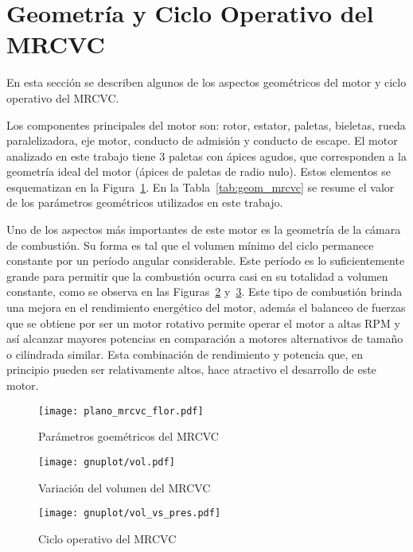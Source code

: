 \section{Geometría y Ciclo Operativo del MRCVC}
%
En esta sección se describen algunos de los aspectos geométricos del motor y
ciclo operativo del MRCVC.

Los componentes principales del motor son: rotor, estator, paletas, bieletas,
rueda paralelizadora, eje motor, conducto de admisión y conducto de escape.
%
El motor analizado en este trabajo tiene 3 paletas con ápices agudos, que
corresponden a la geometría ideal del motor (ápices de paletas de radio nulo).
%
Estos elementos se esquematizan en la Figura~\ref{fig:geom_flor_mrcvc}.
%
En la Tabla~\ref{tab:geom_mrcvc} se resume el valor de los parámetros
geométricos utilizados en este trabajo.

Uno de los aspectos más importantes de este motor es la geometría de la cámara
de combustión.
%
Su forma es tal que el volumen mínimo del ciclo permanece constante por un
período angular considerable. %
%
Este período es lo suficientemente grande para permitir que la combustión
ocurra casi en su totalidad a volumen constante, como se observa en las
Figuras~\ref{fig:mrcvc_vol_cte} y~\ref{fig:PV_mrcvc}.
%
Este tipo de combustión brinda una mejora en el rendimiento energético del
motor, además el balanceo de fuerzas que se obtiene por ser un motor rotativo
permite operar el motor a altas RPM y así alcanzar mayores potencias en
comparación a motores alternativos de tamaño o cilindrada similar.
%
Esta combinación de rendimiento y potencia que, en principio pueden ser
relativamente altos, hace atractivo el desarrollo de este motor.
%

\begin{figure}[h!]
  \centering
  \texttt{[image: plano\_mrcvc\_flor.pdf]}
  \caption{Parámetros goemétricos del MRCVC~\parencite{roldan20}}\label{fig:geom_flor_mrcvc}
\end{figure}

\begin{figure}[h!]
  \centering
  \texttt{[image: gnuplot/vol.pdf]}
  \caption{Variación del volumen del MRCVC}\label{fig:mrcvc_vol_cte}
\end{figure}

\begin{figure}[h!]
  \centering
  \texttt{[image: gnuplot/vol\_vs\_pres.pdf]}
  \caption{Ciclo operativo del MRCVC}\label{fig:PV_mrcvc}
\end{figure}

